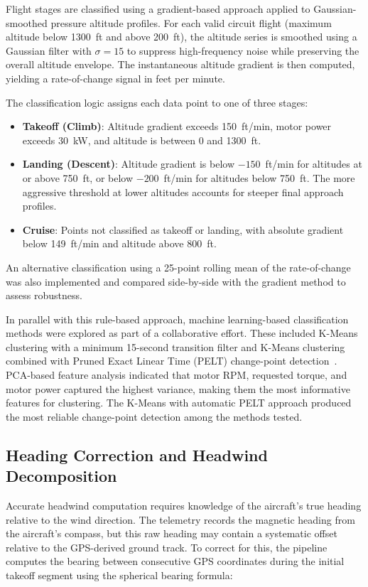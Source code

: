 \documentclass[11pt,a4paper]{article}
\begin{document}
Flight stages are classified using a gradient-based approach applied to Gaussian-smoothed pressure altitude profiles.
For each valid circuit flight (maximum altitude below 1300~ft and above 200~ft), the altitude series is smoothed using a Gaussian filter with $\sigma = 15$ to suppress high-frequency noise while preserving the overall altitude envelope.
The instantaneous altitude gradient is then computed, yielding a rate-of-change signal in feet per minute.

The classification logic assigns each data point to one of three stages:

\begin{itemize}
    \item \textbf{Takeoff (Climb)}: Altitude gradient exceeds 150~ft/min, motor power exceeds 30~kW, and altitude is between 0 and 1300~ft.
    \item \textbf{Landing (Descent)}: Altitude gradient is below $-150$~ft/min for altitudes at or above 750~ft, or below $-200$~ft/min for altitudes below 750~ft. The more aggressive threshold at lower altitudes accounts for steeper final approach profiles.
    \item \textbf{Cruise}: Points not classified as takeoff or landing, with absolute gradient below 149~ft/min and altitude above 800~ft.
\end{itemize}

An alternative classification using a 25-point rolling mean of the rate-of-change was also implemented and compared side-by-side with the gradient method to assess robustness.

In parallel with this rule-based approach, machine learning-based classification methods were explored as part of a collaborative effort.
These included K-Means clustering with a minimum 15-second transition filter and K-Means clustering combined with Pruned Exact Linear Time (PELT) change-point detection~\cite{killick2012}.
PCA-based feature analysis indicated that motor RPM, requested torque, and motor power captured the highest variance, making them the most informative features for clustering.
The K-Means with automatic PELT approach produced the most reliable change-point detection among the methods tested.

\subsection{Heading Correction and Headwind Decomposition}

Accurate headwind computation requires knowledge of the aircraft's true heading relative to the wind direction.
The telemetry records the magnetic heading from the aircraft's compass, but this raw heading may contain a systematic offset relative to the GPS-derived ground track.
To correct for this, the pipeline computes the bearing between consecutive GPS coordinates during the initial takeoff segment using the spherical bearing formula:
\end{document}
